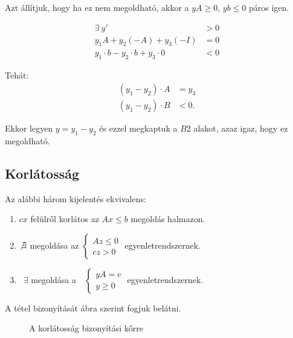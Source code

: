 Azt állítjuk, hogy ha ez nem megoldható, akkor a $ yA \geq 0$, $yb \leq 0$ páros
igen.

\begin{align*}
\exists~y' &> 0 \\
y_1 A + y_2 (-A) + y_3(-I) &= 0 \\
y_1 \cdot b - y_2 \cdot b + y_3 \cdot 0 &<0
\end{align*}

Tehát:
\begin{align*}
(y_1 - y_2) \cdot A &= y_3 \\
(y_1 - y_2) \cdot B &< 0.
\end{align*}

Ekkor legyen $y=y_1-y_2$ és ezzel megkaptuk a $B2$ alakot, azaz igaz, hogy ez
megoldható.

\subsection{Korlátosság}

Az alábbi három kijelentés ekvivalens:

\begin{enumerate}
  \item $cx$ felülről korlátos az $Ax \leq b$ megoldás halmazon.
  \item $\not \exists$ megoldása az $ \begin{cases}
  Az \leq 0 \\
  cz > 0
  \end{cases} $ egyenletrendszernek.
  \item ~$\exists$ megoldása a~~$\begin{cases}
  yA=c \\
  y \geq 0
  \end{cases}$ egyenletrendszernek.
\end{enumerate}

A tétel bizonyítását  ábra szerint fogjuk belátni.
 
\begin{figure}[htbp]
\caption{A korlátosság bizonyítási kőrre}
\label{fig:KorBizKor}
\centering {} 
\end{figure}

